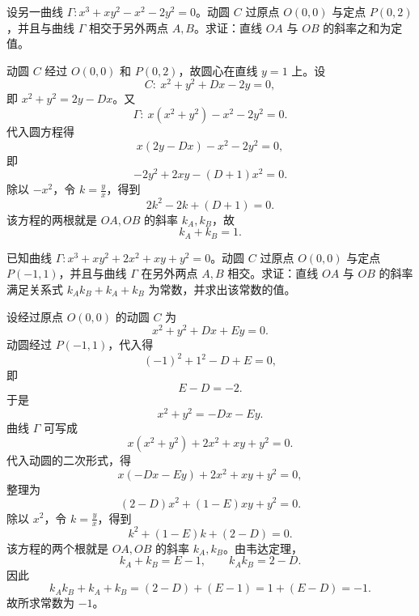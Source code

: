 \begin{example}
设另一曲线 $\Gamma: x^3 + xy^2 - x^2 - 2y^2 = 0$。动圆 $C$ 过原点 $O(0,0)$ 与定点 $P(0,2)$，并且与曲线 $\Gamma$ 相交于另外两点 $A, B$。求证：直线 $OA$ 与 $OB$ 的斜率之和为定值。
\end{example}
\begin{solution}
动圆 $C$ 经过 $O(0,0)$ 和 $P(0,2)$，故圆心在直线 $y=1$ 上。设
\[
C:\ x^2+y^2+Dx-2y=0,
\]
即 $x^2+y^2=2y-Dx$。又
\[
\Gamma:\ x(x^2+y^2)-x^2-2y^2=0.
\]
代入圆方程得
\[
x(2y-Dx)-x^2-2y^2=0,
\]
即
\[
-2y^2+2xy-(D+1)x^2=0.
\]
除以 $-x^2$，令 $k=\frac yx$，得到
\[
2k^2-2k+(D+1)=0.
\]
该方程的两根就是 $OA,OB$ 的斜率 $k_A,k_B$，故
\[
k_A+k_B=1.
\]
\end{solution}

\begin{example}
    已知曲线 $\Gamma: x^3 + xy^2 + 2x^2 + xy + y^2 = 0$。动圆 $C$ 过原点 $O(0,0)$ 与定点 $P(-1, 1)$，并且与曲线 $\Gamma$ 在另外两点 $A, B$ 相交。求证：直线 $OA$ 与 $OB$ 的斜率满足关系式 $k_A k_B + k_A + k_B$ 为常数，并求出该常数的值。
\end{example}
\begin{solution}
设经过原点 $O(0,0)$ 的动圆 $C$ 为
\[
x^2+y^2+Dx+Ey=0.
\]
动圆经过 $P(-1,1)$，代入得
\[
(-1)^2+1^2-D+E=0,
\]
即
\[
E-D=-2.
\]
于是
\[
x^2+y^2=-Dx-Ey.
\]
曲线 $\Gamma$ 可写成
\[
x(x^2+y^2)+2x^2+xy+y^2=0.
\]
代入动圆的二次形式，得
\[
x(-Dx-Ey)+2x^2+xy+y^2=0,
\]
整理为
\[
(2-D)x^2+(1-E)xy+y^2=0.
\]
除以 $x^2$，令 $k=\frac yx$，得到
\[
k^2+(1-E)k+(2-D)=0.
\]
该方程的两个根就是 $OA,OB$ 的斜率 $k_A,k_B$。由韦达定理，
\[
k_A+k_B=E-1,\qquad k_Ak_B=2-D.
\]
因此
\[
k_Ak_B+k_A+k_B=(2-D)+(E-1)=1+(E-D)=-1.
\]
故所求常数为 $-1$。
\end{solution}

